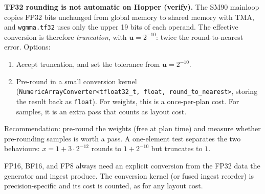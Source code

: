 \documentclass[10pt,letterpaper]{article}
\newcommand{\ur}{\mathbf{u}}
\begin{document}
\textbf{TF32 rounding is not automatic on Hopper (verify).} The SM90 mainloop copies FP32 bits unchanged from global memory to shared memory with TMA, and \texttt{wgmma.tf32} uses only the upper 19 bits of each operand. The effective conversion is therefore \emph{truncation}, with $\ur = 2^{-10}$: twice the round-to-nearest error. Options:
\begin{enumerate}
  \item Accept truncation, and set the tolerance from $\ur = 2^{-10}$.
  \item Pre-round in a small conversion kernel (\texttt{NumericArrayConverter<tfloat32\_t, float, round\_to\_nearest>}, storing the result back as \texttt{float}). For weights, this is a once-per-plan cost. For samples, it is an extra pass that counts as layout cost.
\end{enumerate}
Recommendation: pre-round the weights (free at plan time) and measure whether pre-rounding samples is worth a pass. A one-element test separates the two behaviours: $x = 1 + 3 \cdot 2^{-12}$ rounds to $1 + 2^{-10}$ but truncates to $1$.

FP16, BF16, and FP8 always need an explicit conversion from the FP32 data the generator and ingest produce. The conversion kernel (or fused ingest reorder) is precision-specific and its cost is counted, as for any layout cost.
\end{document}

